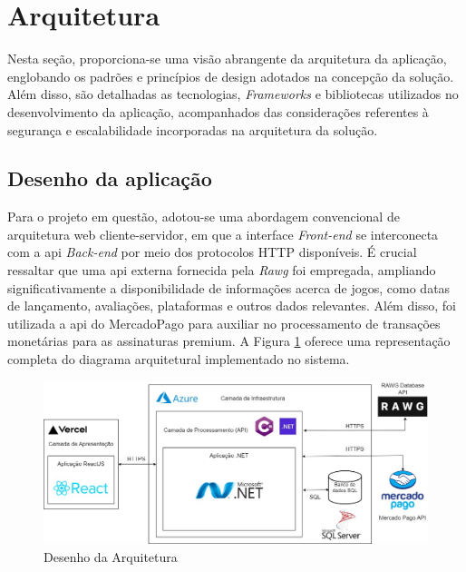 \section{Arquitetura}

Nesta seção, proporciona-se uma visão abrangente da arquitetura da aplicação, englobando os padrões e princípios de design adotados na concepção da solução. Além disso, são detalhadas as tecnologias, \textit{\gls{Frameworks}} e bibliotecas utilizados no desenvolvimento da aplicação, acompanhados das considerações referentes à segurança e escalabilidade incorporadas na arquitetura da solução.

\subsection{Desenho da aplicação}

Para o projeto em questão, adotou-se uma abordagem convencional de arquitetura web cliente-servidor, em que a interface \textit{\gls{Front-end}} se interconecta com a \ac{api} \textit{\gls{Back-end}} por meio dos protocolos HTTP disponíveis. É crucial ressaltar que uma \ac{api} externa fornecida pela \textit{\gls{Rawg}} foi empregada, ampliando significativamente a disponibilidade de informações acerca de jogos, como datas de lançamento, avaliações, plataformas e outros dados relevantes. Além disso, foi utilizada a \ac{api} do \gls{MercadoPago} para auxiliar no processamento de transações monetárias para as assinaturas premium. A Figura \ref{DesenhoArquitetura} oferece uma representação completa do diagrama arquitetural implementado no sistema.

\begin{figure}[H]
    \centering
	\caption{Desenho da Arquitetura}
    \label{DesenhoArquitetura}
    \includegraphics[scale = 0.37]{imagens/arquitetura/desenho_arquitetura.jpg}	
\end{figure}

